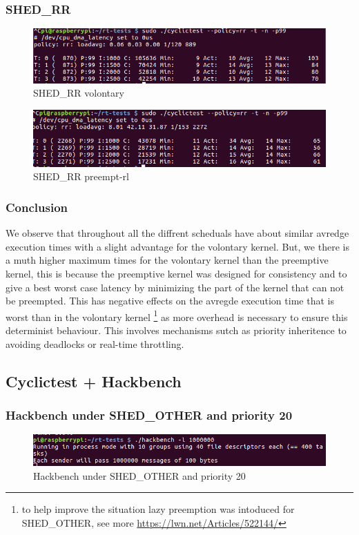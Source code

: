 \documentclass[10pt,a4paper]{article}
\begin{document}
\subsubsection{SHED\_RR}
\begin{figure}[h]
\includegraphics[width=16cm]{Voluntary-RR-WithoutHackbench.png}
\caption{SHED\_RR volontary}
\end{figure}
\begin{figure}[H]
\includegraphics[width=16cm]{Preempt-RR-WithoutHackbench.png}
\caption{SHED\_RR preempt-rl}
\end{figure}
\subsubsection{Conclusion}
We observe that throughout all the diffrent scheduals have about similar avredge execution times with a slight advantage for the volontary kernel. But, we there is a muth higher maximum times for the volontary kernel than the preemptive kernel, this is because the preemptive kernel was designed for consistency and to give a best worst case latency by minimizing the part of the kernel that can not be preempted.  This has negative effects on the avregde execution time that is worst than in the volontary kernel \footnote{to help improve the situation lazy preemption was intoduced for SHED\_OTHER, see more \url{https://lwn.net/Articles/522144/}} as more overhead is necessary to ensure this determinist behaviour. This involves mechanisms sutch as priority inheritence to avoiding deadlocks or real-time throttling.

\subsection{Cyclictest + Hackbench}
\subsubsection{Hackbench under SHED\_OTHER and priority 20}
\begin{figure}[H]
\includegraphics[width=16cm]{Volontary-other-Hackbench-p20.png}
\caption{Hackbench under SHED\_OTHER and priority 20}
\end{figure}
\end{document}
